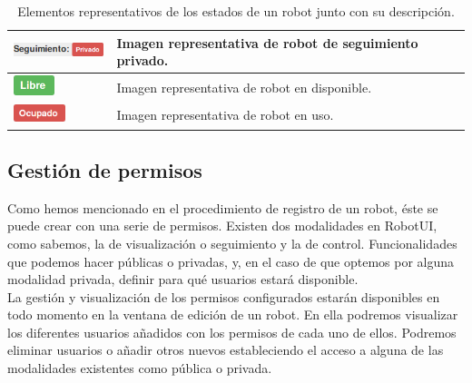 \begin{table}[H]
\begin{center}
\begin{tabular}{|p{3.5cm}|p{10cm}|}
      \hline
      \vspace*{0.1cm}
      \hspace*{0.4cm}
      \includegraphics[width=2.8cm]{imagenes/manual-usuario/seguimiento-privado.png} & Imagen representativa de robot de seguimiento privado. \\
      \hline
      \vspace*{0.1cm}
      \hspace*{1.1cm}
      \includegraphics[width=1.2cm]{imagenes/manual-usuario/libre.png} & Imagen representativa de robot en disponible. \\
      \hline
      \vspace*{0.1cm}
      \hspace*{1cm}
      \includegraphics[width=1.5cm]{imagenes/manual-usuario/ocupado.png} & Imagen representativa de robot en uso. \\
      \hline     
    \end{tabular}
  \end{center}
\caption{Elementos representativos de los estados de un robot junto con su descripción.}
\label{table:robot-estados}
\end{table}


\subsection{Gestión de permisos}

Como hemos mencionado en el procedimiento de registro de un robot, éste se puede crear con una serie de permisos. Existen dos modalidades en RobotUI, como sabemos, la de visualización o seguimiento
y la de control. Funcionalidades que podemos hacer públicas o privadas, y, en el caso de que optemos por alguna modalidad privada, definir para qué usuarios estará disponible.\\

La gestión y visualización de los permisos configurados estarán disponibles en todo momento en la ventana de edición de un robot. En ella podremos visualizar los diferentes usuarios añadidos con
los permisos de cada uno de ellos. Podremos eliminar usuarios o añadir otros nuevos estableciendo el acceso a alguna de las modalidades existentes como pública o privada.\\

